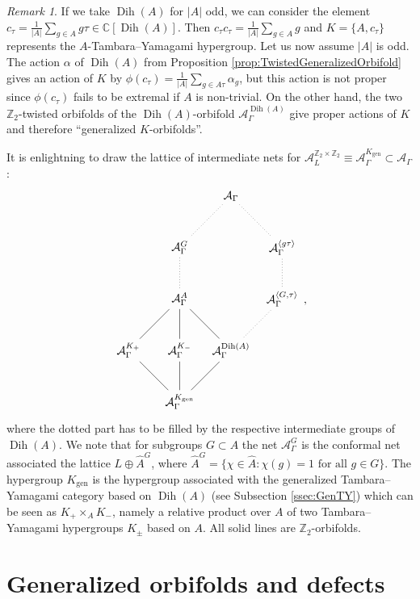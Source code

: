 \documentclass[twoside,11pt,reqno]{amsart}
\theoremstyle{definition}
\theoremstyle{remark}
\newtheorem{rmk}[thm]{Remark}
\newcommand{\A}{\mathcal{A}}
\newcommand{\CC}{\mathbb{C}}
\newcommand{\ZZ}{\mathbb{Z}}
\DeclareMathOperator{\Dih}{Dih}
\newcommand{\tikzmath}[2][0.50]
{\vcenter{\hbox{\begin{tikzpicture}[scale=#1] #2\end{tikzpicture}}}
}
\begin{document}
\begin{rmk}
  If we take $\Dih(A)$ for $|A|$ odd, we can consider 
  the element $c_\tau=\frac{1}{|A|}\sum_{g\in A} g\tau\in \CC[\Dih(A)]$.
  Then $c_\tau c_\tau=\frac1{|A|}\sum_{g\in A}g$ and 
  $K=\{A,c_\tau\}$ represents the $A$-Tambara--Yamagami hypergroup.
  Let us now assume $|A|$ is odd.
  The action $\alpha$ of $\Dih(A)$ from Proposition
  \ref{prop:TwistedGeneralizedOrbifold} gives an action 
  of $K$ by $\phi(c_\tau)=\frac{1}{|A|} \sum_{g\in A\tau} \alpha_{g}$, 
  but this action is not proper since 
  $\phi(c_\tau)$ fails to be extremal if $A$ is non-trivial.
  On the other hand, the two $\ZZ_2$-twisted orbifolds 
  of the $\Dih(A)$-orbifold $\A_{\Gamma}^{\Dih(A)}$ give proper actions of $K$
  and therefore ``generalized $K$-orbifolds''.

  It is enlightning to draw the lattice of intermediate nets
  for $\A_L^{\ZZ_2\times\ZZ_2}\equiv \A_\Gamma^{K_\mathrm{gen}}\subset \A_\Gamma$:
  $$
    \tikzmath[0.4]{
      \node (tr)  at (4,16) {$\A_{\Gamma}$};
      \node (tau)  at (8,12) {$\A_{\Gamma}^{\langle g\tau\rangle}$};
      \node (G)  at (0,12) {$\A_{\Gamma}^{G}$};
      \node (Gtau)  at (8,8) {$\A_{\Gamma}^{\langle G,\tau\rangle}$};
      \node (H)  at (0,8) {$\A_{\Gamma}^{A}$};
      \node (Kp)  at (-4,4) {$\A_{\Gamma}^{K_+}$};
      \node (Km)  at (0,4) {$\A_{\Gamma}^{K_-}$};
      \node (Dih)  at (4,4) {$\A_{\Gamma}^{\Dih(A)}$};
      \node (GTY)  at (0,0) {$\A_{\Gamma}^{K_\mathrm{gen}}$};
      \draw[dotted] (tr)--(tau)
(tr)--(G) (G)--(H) (tau)--(Gtau) (Gtau)--(Dih);
      \draw         (H)--(Kp) (H)--(Km) (H)--(Dih)
        (GTY)--(Kp) (GTY)--(Km) (GTY)--(Dih);
  }\,,
  $$
  where the dotted part has to be filled by the respective
  intermediate groups of $\Dih(A)$. 
  We note that for subgroups $G\subset A$ the net
  $\A_{\Gamma}^G$ is the conformal net 
  associated the lattice $L\oplus \hat A^G$,
  where $\hat A^G=\{\chi\in \hat A: \chi (g)=1 \text{ for all }g\in G\}$.
  The hypergroup $K_\mathrm{gen}$ is the hypergroup associated with the generalized Tambara--Yamagami category   based
  on $\Dih(A)$ (see Subsection \ref{ssec:GenTY})
 which can be seen as $K_+\times_{A} K_-$, namely a relative product over $A$ of two Tambara--Yamagami 
  hypergroups $K_\pm$ based on $A$.
  All solid lines are $\ZZ_2$-orbifolds.
\end{rmk}

\section{Generalized orbifolds and defects}
\label{sec:GeneralizedOrbifoldsAndDefects}
\end{document}
